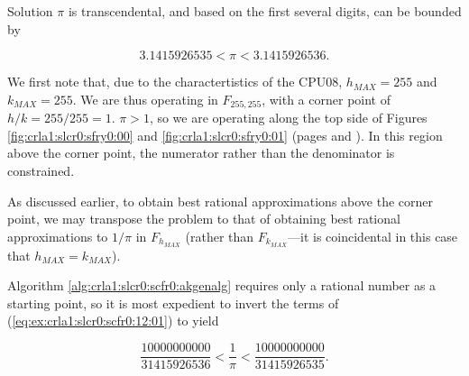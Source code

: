 \begin{vworkexampleparsection}{Solution} $\pi$ is transcendental, and based
on the first several digits, can be bounded by

\begin{equation}
\label{eq:ex:crla1:slcr0:scfr0:12:01}
3.1415926535 < \pi < 3.1415926536 .
\end{equation}  

We first note that, due to the charactertistics of the CPU08, 
$h_{MAX} = 255$ and $k_{MAX} = 255$.  We are thus operating in
$F_{255, 255}$, with a corner point of $h/k = 255/255 = 1$.
$\pi > 1$, so we are operating along the top side of Figures
\ref{fig:crla1:slcr0:sfry0:00} and \ref{fig:crla1:slcr0:sfry0:01}
(pages \pageref{fig:crla1:slcr0:sfry0:00} and \pageref{fig:crla1:slcr0:sfry0:01}).
In this region above the corner point, the numerator rather than the denominator
is constrained.

As discussed earlier, to obtain best rational approximations above the corner point,
we may transpose the problem to that of obtaining best rational approximations
to $1/\pi$ in $F_{h_{MAX}}$ (rather than $F_{k_{MAX}}$---it is coincidental in this
case that $h_{MAX} = k_{MAX}$).

Algorithm \ref{alg:crla1:slcr0:scfr0:akgenalg} requires only a rational number as a starting
point, so it is most expedient to invert the terms of 
(\ref{eq:ex:crla1:slcr0:scfr0:12:01}) to yield

\begin{equation}
\label{eq:ex:crla1:slcr0:scfr0:12:02}
\frac{10000000000}{31415926536} 
< 
\frac{1}{\pi} 
< 
\frac{10000000000}{31415926535} .
\end{equation}


\end{vworkexampleparsection}
